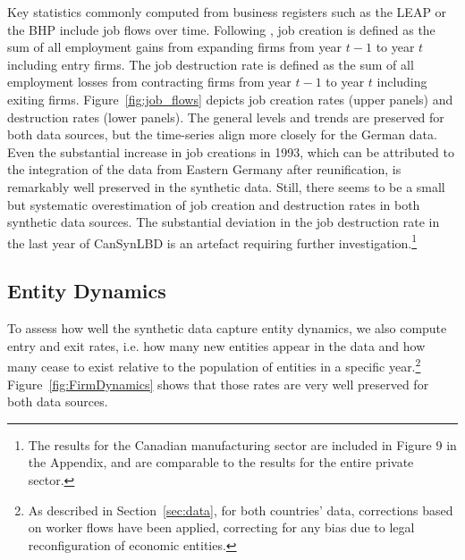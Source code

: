 \documentclass[10pt]{article}
\begin{document}
Key statistics commonly computed from business registers such as the LEAP or the BHP include job flows over time. Following \citet{DavisHaltiwangerSchuh}, job creation is defined as the sum of all employment gains from expanding firms from year $t-1$ to year $t$ including entry firms. The job destruction rate is defined as the sum of all employment losses from contracting firms from year $t-1$ to year $t$ including exiting firms. Figure~\ref{fig:job_flows} depicts  job creation rates (upper panels) and destruction rates (lower panels). The general levels and trends are preserved for both data sources, but the time-series align more closely for the German data. Even the substantial increase in job creations in 1993, which can be attributed to the integration of the data from Eastern Germany after reunification, is remarkably well preserved in the synthetic data. Still, there seems to be a small but systematic overestimation of job creation and destruction rates in both synthetic data sources. The substantial deviation in the job destruction rate in the last year of CanSynLBD is an artefact  requiring further investigation.\footnote{The results for the Canadian manufacturing sector are included in Figure 9
in the  Appendix, and are comparable to the results for the entire private sector.}





\subsection{Entity Dynamics}


To assess how well the synthetic data capture entity dynamics, we also compute entry and exit rates, i.e. how many new entities appear in the data and how many cease to exist relative to the population of entities in a specific year.\footnote{As described in Section~\ref{sec:data}, for both countries' data, corrections based on worker flows have been applied, correcting for any bias due to legal reconfiguration of economic entities.} Figure~\ref{fig:FirmDynamics} shows that those rates are very well preserved for both data sources. 
\end{document}

